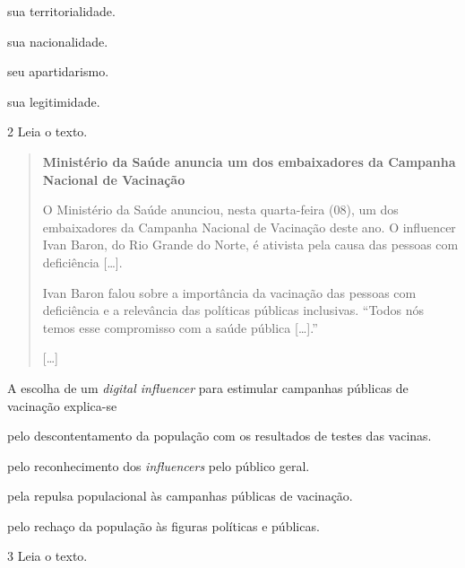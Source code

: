 \begin{escolha}
\item
  sua territorialidade.
\item
  sua nacionalidade.
\item
  seu apartidarismo.
\item
  sua legitimidade.
\end{escolha}

\num{2} Leia o texto.

\begin{quote}
\textbf{Ministério da Saúde anuncia um dos embaixadores da Campanha Nacional de Vacinação}

O Ministério da Saúde anunciou, nesta quarta-feira (08), um dos
embaixadores da Campanha Nacional de Vacinação deste ano. O influencer
Ivan Baron, do Rio Grande do Norte, é ativista pela causa das pessoas
com deficiência {[}\ldots{}{]}.

Ivan Baron falou sobre a importância da vacinação das pessoas com
deficiência e a relevância das políticas públicas inclusivas. ``Todos
nós temos esse compromisso com a saúde pública {[}\ldots{}{]}.''

{[}\ldots{}{]}

\end{quote}

A escolha de um \emph{digital influencer} para estimular campanhas
públicas de vacinação explica-se

\begin{escolha}
\item
  pelo descontentamento da população com os resultados de testes das
  vacinas.
\item
  pelo reconhecimento dos \emph{influencers} pelo público geral.
\item
  pela repulsa populacional às campanhas públicas de vacinação.
\item
  pelo rechaço da população às figuras políticas e públicas.
\end{escolha}

\num{3} Leia o texto.

